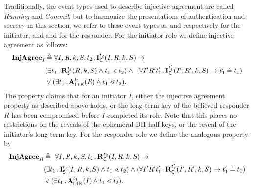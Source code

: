 Traditionally, the event types used to describe injective agreement are called
\emph{Running} and \emph{Commit}, but to harmonize the presentations of
authentication and secrecy in this section, we refer to these event types as
\mIStart{} and \mIComplete{} respectively for the initiator, and
\mRStart{} and \mRComplete{} for the responder.
%
For the initiator role we define injective agreement as follows:
\begin{align*}
    \mathbf{InjAgree}_I& \triangleq
    \forall I, R, k, S, t_2\operatorname{.} \mathbf{I}_{\textsf{C}}^{t_2}(I, R, k, S)
    \rightarrow\\
    &(\exists t_1\operatorname{.} \mathbf{R}_{\textsf{S}}^{t_1}(R, k, S) \land t_1 \lessdot t_2)
    \land\ (\forall I' R' t_1' \operatorname{.} \mathbf{I}_{\textsf{C}}^{t_1'}(I' , R', k, S)
        \rightarrow t_1' \doteq t_1) \\
    &\lor(\exists t_1\operatorname{.} \mathbf{A}_{\textsf{LTK}}^{t_1}(R) \land t_1 \lessdot t_2).
\end{align*}
%
The property claims that for an initiator $I$, either the injective agreement
property as described above holds, or the long-term key of the believed
responder $R$ has been compromised before $I$ completed its role.
%
Note that this places no restrictions on the reveals of the ephemeral
DH half-keys, or the reveal of the initiator's long-term key.
%
For the responder role we define the analogous property by
\begin{align*}
    \mathbf{InjAgree}_R& \triangleq\
    \forall I, R, k, S, t_2\operatorname{.} \mathbf{R}_{\textsf{C}}^{t_2}(I, R, k, S)
    \rightarrow\\
    &(\exists t_1\operatorname{.} \mathbf{I}_{\textsf{S}}^{t_1}(I, R, k, S) \land t_1 \lessdot t_2)
    \land (\forall I' R' t_1' \operatorname{.} \mathbf{R}_{\textsf{C}}^{t_1'}(I' , R', k, S)
        \rightarrow t_1' \doteq t_1)\\
    &\lor(\exists t_1\operatorname{.} \mathbf{A}_{\textsf{LTK}}^{t_1}(I) \land t_1 \lessdot t_2).
\end{align*}
%
